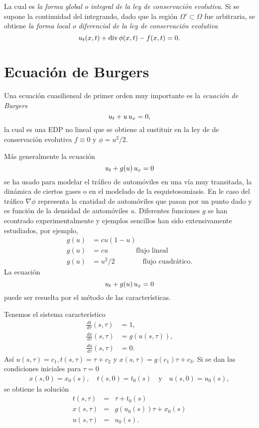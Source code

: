La cual es \textit{la forma global o integral de la ley de conservación evolutiva}. Si se supone la continuidad del integrando, dado que la región $\Omega' \subset \Omega$ fue arbitraria, se obtiene \textit{la forma local o diferencial de la ley de conservación evolutiva}
\[
u_t (x,t) + \text{div} \thinspace \phi(x,t)-f(x,t) = 0.
\]  

\section{Ecuación de Burgers}
Una ecuación cuasilieneal de primer orden muy importante es la \textit{ecuación de Burgers}
\[ u_t + u \thinspace u_x = 0, \]
la cual es una EDP no lineal que se obtiene al sustituir en la ley de de conservación evolutiva $f \equiv 0$ y $\phi = u^2 /2$.

Más generalmente la ecuación 
\[
u_t + g(u) \thinspace u_x = 0
\]
se ha usado para modelar el tráfico de automóviles en una vía muy transitada, la dinámica de ciertos gases o en el modelado de la esquistosomiasis. En le caso del tráfico $\nabla \phi$ representa la cnatidad de automóviles que pasan por un punto dado y es función de la densidad de automóviles $u$. Diferentes funciones $g$ se han econtrado experimentalmente y ejemplos sencillos han sido extensivamente estudiados, por ejemplo,
\begin{align*}
g(u) &= cu (1-u) \\
g(u) &= cu \qquad \qquad \text{flujo lineal} \\
g(u) &= u^2/2 \qquad \qquad \text{flujo cuadrático}.
\end{align*}
La ecuación
\begin{equation*}
u_t + g(u) \thinspace u_x =0
\end{equation*}
puede ser resuelta por el método de las características.

Tenemos el sistema característico
\begin{align*}
\frac{\,dt}{\,d\tau} (s, \tau) &= 1,\\
\frac{\,dx}{\,d\tau} (s, \tau) &= g(u(s, \tau)),\\
\frac{\,du}{\,d\tau} (s, \tau) &= 0.
\end{align*}
Así $u(s,\tau)=c_1 , t(s,\tau) = \tau+c_2$ y $x (s,\tau)=g(c_1) \tau + c_3$. 
Si se dan las condiciones iniciales para $\tau=0$
\begin{align*}
x(s,0)=x_0(s), \quad t(s,0)=t_0(s) \quad \text{y} \quad u(s,0)=u_0(s),
\end{align*}
se obtiene la solución
\begin{eqnarray*}
t(s,\tau) &=& \tau + t_0(s) \\
x(s,\tau) &=& g(u_0(s)) \tau + x_0(s) \\
u(s,\tau) &=& u_0(s).
\end{eqnarray*}

